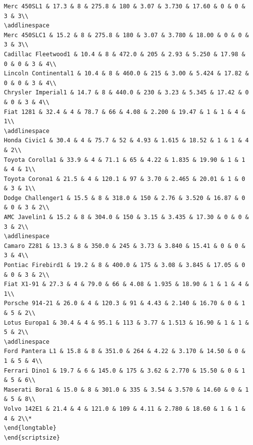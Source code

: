 \documentclass[a4paper, nobind]{templates/ociamthesis}
\begin{document}
\begin{verbatim}
Merc 450SL1 & 17.3 & 8 & 275.8 & 180 & 3.07 & 3.730 & 17.60 & 0 & 0 & 3 & 3\\
\addlinespace
Merc 450SLC1 & 15.2 & 8 & 275.8 & 180 & 3.07 & 3.780 & 18.00 & 0 & 0 & 3 & 3\\
Cadillac Fleetwood1 & 10.4 & 8 & 472.0 & 205 & 2.93 & 5.250 & 17.98 & 0 & 0 & 3 & 4\\
Lincoln Continental1 & 10.4 & 8 & 460.0 & 215 & 3.00 & 5.424 & 17.82 & 0 & 0 & 3 & 4\\
Chrysler Imperial1 & 14.7 & 8 & 440.0 & 230 & 3.23 & 5.345 & 17.42 & 0 & 0 & 3 & 4\\
Fiat 1281 & 32.4 & 4 & 78.7 & 66 & 4.08 & 2.200 & 19.47 & 1 & 1 & 4 & 1\\
\addlinespace
Honda Civic1 & 30.4 & 4 & 75.7 & 52 & 4.93 & 1.615 & 18.52 & 1 & 1 & 4 & 2\\
Toyota Corolla1 & 33.9 & 4 & 71.1 & 65 & 4.22 & 1.835 & 19.90 & 1 & 1 & 4 & 1\\
Toyota Corona1 & 21.5 & 4 & 120.1 & 97 & 3.70 & 2.465 & 20.01 & 1 & 0 & 3 & 1\\
Dodge Challenger1 & 15.5 & 8 & 318.0 & 150 & 2.76 & 3.520 & 16.87 & 0 & 0 & 3 & 2\\
AMC Javelin1 & 15.2 & 8 & 304.0 & 150 & 3.15 & 3.435 & 17.30 & 0 & 0 & 3 & 2\\
\addlinespace
Camaro Z281 & 13.3 & 8 & 350.0 & 245 & 3.73 & 3.840 & 15.41 & 0 & 0 & 3 & 4\\
Pontiac Firebird1 & 19.2 & 8 & 400.0 & 175 & 3.08 & 3.845 & 17.05 & 0 & 0 & 3 & 2\\
Fiat X1-91 & 27.3 & 4 & 79.0 & 66 & 4.08 & 1.935 & 18.90 & 1 & 1 & 4 & 1\\
Porsche 914-21 & 26.0 & 4 & 120.3 & 91 & 4.43 & 2.140 & 16.70 & 0 & 1 & 5 & 2\\
Lotus Europa1 & 30.4 & 4 & 95.1 & 113 & 3.77 & 1.513 & 16.90 & 1 & 1 & 5 & 2\\
\addlinespace
Ford Pantera L1 & 15.8 & 8 & 351.0 & 264 & 4.22 & 3.170 & 14.50 & 0 & 1 & 5 & 4\\
Ferrari Dino1 & 19.7 & 6 & 145.0 & 175 & 3.62 & 2.770 & 15.50 & 0 & 1 & 5 & 6\\
Maserati Bora1 & 15.0 & 8 & 301.0 & 335 & 3.54 & 3.570 & 14.60 & 0 & 1 & 5 & 8\\
Volvo 142E1 & 21.4 & 4 & 121.0 & 109 & 4.11 & 2.780 & 18.60 & 1 & 1 & 4 & 2\\*
\end{longtable}
\end{scriptsize}


\end{verbatim}
\end{document}
